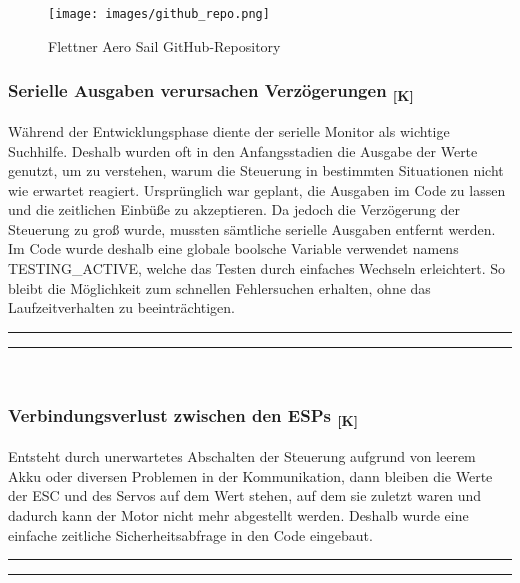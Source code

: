 \documentclass[a4paper,12pt]{article}
\begin{document}
\begin{figure}[H]
    \centering
    \texttt{[image: images/github\_repo.png]}
    \caption{Flettner Aero Sail GitHub-Repository}
    \label{fig:Github Projekt}
\end{figure}

\subsubsection{\texorpdfstring{Serielle Ausgaben verursachen Verzögerungen \textsubscript{[K]}}{Serielle Ausgaben verursachen Verzögerungen [K]}}
Während der Entwicklungsphase diente der serielle Monitor als wichtige Suchhilfe. Deshalb wurden oft in den Anfangsstadien die Ausgabe der Werte genutzt, um zu verstehen, warum die Steuerung in bestimmten Situationen nicht wie erwartet reagiert. Ursprünglich war geplant, die Ausgaben im Code zu lassen und die zeitlichen Einbüße zu akzeptieren. Da jedoch die Verzögerung der Steuerung zu groß wurde, mussten sämtliche serielle Ausgaben entfernt werden. Im Code wurde deshalb eine globale boolsche Variable verwendet namens TESTING\_ACTIVE, welche das Testen durch einfaches Wechseln erleichtert. So bleibt die Möglichkeit zum schnellen Fehlersuchen erhalten, ohne das Laufzeitverhalten zu beeinträchtigen. 
\newline\noindent\rule{\linewidth}{0.4pt}  %

\noindent\rule{\linewidth}{0.4pt}\\[0.5em]  %


\subsubsection{\texorpdfstring{Verbindungsverlust zwischen den ESPs \textsubscript{[K]}}{Verbindungsverlust zwischen den ESPs [K]}}
Entsteht durch unerwartetes Abschalten der Steuerung aufgrund von leerem Akku oder diversen Problemen in der Kommunikation, dann bleiben die Werte der ESC und des Servos auf dem Wert stehen, auf dem sie zuletzt waren und dadurch kann der Motor nicht mehr abgestellt werden. Deshalb wurde eine einfache zeitliche Sicherheitsabfrage in den Code eingebaut. 
\newline\noindent\rule{\linewidth}{0.4pt}  %

\noindent\rule{\linewidth}{0.4pt}\\[0.5em]  %
\end{document}
